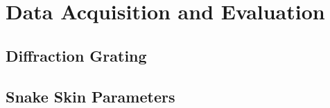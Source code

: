 \section{Data Acquisition and Evaluation}
\subsection{Diffraction Grating}
\subsection{Snake Skin Parameters}